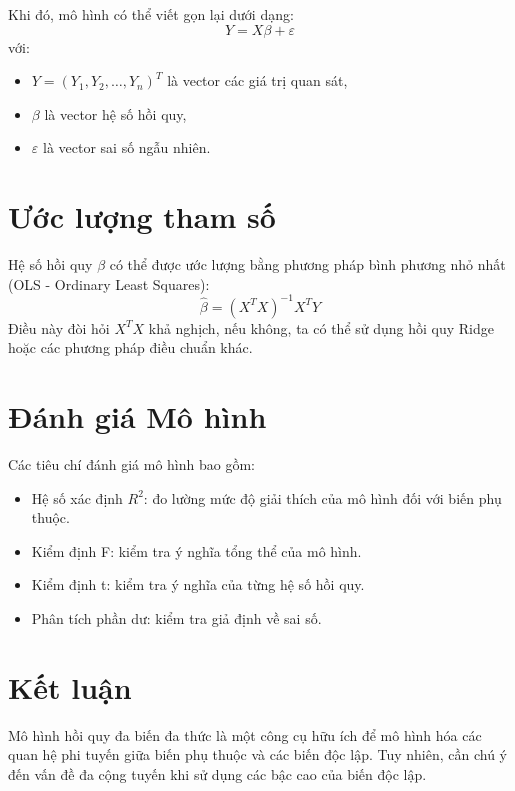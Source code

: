 Khi đó, mô hình có thể viết gọn lại dưới dạng:
\begin{equation}
    Y = X \beta + \varepsilon
\end{equation}
với:
\begin{itemize}
    \item $Y = (Y_1, Y_2, \dots, Y_n)^T$ là vector các giá trị quan sát,
    \item $\beta$ là vector hệ số hồi quy,
    \item $\varepsilon$ là vector sai số ngẫu nhiên.
\end{itemize}

\section{Ước lượng tham số}
Hệ số hồi quy $\beta$ có thể được ước lượng bằng phương pháp bình phương nhỏ nhất (OLS - Ordinary Least Squares):
\begin{equation}
    \hat{\beta} = (X^T X)^{-1} X^T Y
\end{equation}
Điều này đòi hỏi $X^T X$ khả nghịch, nếu không, ta có thể sử dụng hồi quy Ridge hoặc các phương pháp điều chuẩn khác.

\section{Đánh giá Mô hình}
Các tiêu chí đánh giá mô hình bao gồm:
\begin{itemize}
    \item Hệ số xác định $R^2$: đo lường mức độ giải thích của mô hình đối với biến phụ thuộc.
    \item Kiểm định F: kiểm tra ý nghĩa tổng thể của mô hình.
    \item Kiểm định t: kiểm tra ý nghĩa của từng hệ số hồi quy.
    \item Phân tích phần dư: kiểm tra giả định về sai số.
\end{itemize}

\section{Kết luận}
Mô hình hồi quy đa biến đa thức là một công cụ hữu ích để mô hình hóa các quan hệ phi tuyến giữa biến phụ thuộc và các biến độc lập. Tuy nhiên, cần chú ý đến vấn đề đa cộng tuyến khi sử dụng các bậc cao của biến độc lập.